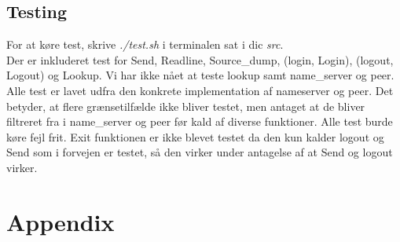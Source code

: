 \documentclass[12pt,a4paper]{article}
\begin{document}
\subsection{Testing}
For at køre test, skrive \textit{./test.sh} i terminalen sat i dic \textit{src}.
\\[10pt]
Der er inkluderet test for Send, Readline, Source_dump, (login, Login), (logout, Logout) og Lookup. Vi har ikke nået at teste lookup samt name_server og peer.
\\[10pt]
Alle test er lavet udfra den konkrete implementation af nameserver og peer. Det betyder, at flere grænsetilfælde ikke bliver testet, men antaget at de bliver filtreret fra i name_server og peer før kald af diverse funktioner. Alle test burde køre fejl frit. Exit funktionen er ikke blevet testet da den kun kalder logout og Send som i forvejen er testet, så den virker under antagelse af at Send og logout virker.

\clearpage

\section{Appendix}



\label{BOH}
\label{KR}
\end{document}
